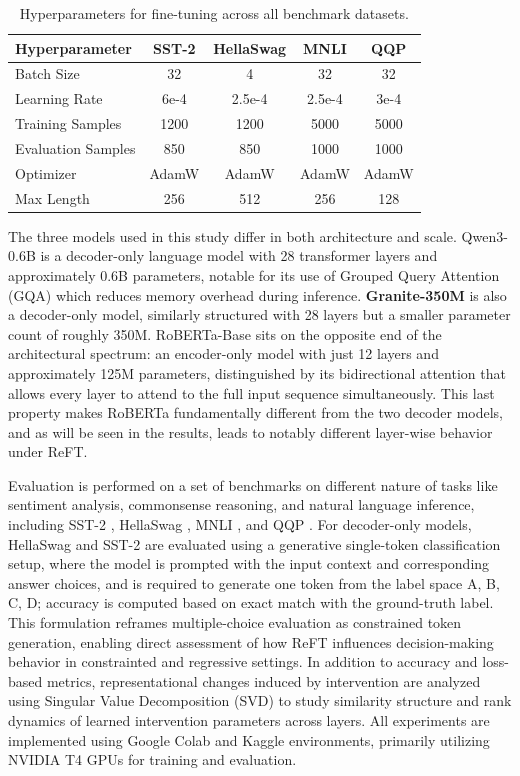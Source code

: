 \documentclass[conference]{IEEEtran}
\begin{document}
	\begin{table}[H]
	\centering
	\caption{Hyperparameters for fine-tuning across all benchmark datasets.}
	\label{tab:hyperparameters}
	\begin{tabular}{lcccc}
		\hline
		\textbf{Hyperparameter} & \textbf{SST-2} & \textbf{HellaSwag} & \textbf{MNLI} & \textbf{QQP} \\
		\hline
		Batch Size         & 32    & 4      & 32     & 32    \\
		Learning Rate      & 6e-4  & 2.5e-4 & 2.5e-4 & 3e-4  \\
		Training Samples   & 1200  & 1200   & 5000   & 5000  \\
		Evaluation Samples & 850   & 850    & 1000   & 1000  \\
		Optimizer          & AdamW & AdamW  & AdamW  & AdamW \\
		Max Length         & 256   & 512    & 256    & 128   \\
		\hline
	\end{tabular}
	\end{table}
	
	The three models used in this study differ in both architecture and scale. Qwen3-0.6B \cite{yang2025qwen3} is a decoder-only language model with 28 transformer layers and approximately 0.6B parameters, notable for its use of Grouped Query Attention (GQA) which reduces memory overhead during inference. \textbf{Granite-350M} is also a decoder-only model, similarly structured with 28 layers but a smaller parameter count of roughly 350M. RoBERTa-Base \cite{liu2019roberta} sits on the opposite end of the architectural spectrum: an encoder-only model with just 12 layers and approximately 125M parameters, distinguished by its bidirectional attention that allows every layer to attend to the full input sequence simultaneously. This last property makes RoBERTa fundamentally different from the two decoder models, and as will be seen in the results, leads to notably different layer-wise behavior under ReFT.

	Evaluation is performed on a set of benchmarks on different nature of tasks like sentiment analysis, commonsense reasoning, and natural language inference, including SST-2 \cite{socher2013recursive}, HellaSwag \cite{zellers2019hellaswag}, MNLI \cite{williams2017broad}, and QQP \cite{iyer2017quora}. For decoder-only models, HellaSwag and SST-2 are evaluated using a generative single-token classification setup, where the model is prompted with the input context and corresponding answer choices, and is required to generate one token from the label space {A, B, C, D}; accuracy is computed based on exact match with the ground-truth label. This formulation reframes multiple-choice evaluation as constrained token generation, enabling direct assessment of how ReFT influences decision-making behavior in constrainted and regressive settings. In addition to accuracy and loss-based metrics, representational changes induced by intervention are analyzed using Singular Value Decomposition (SVD) to study similarity structure and rank dynamics of learned intervention parameters across layers. All experiments are implemented using Google Colab and Kaggle environments, primarily utilizing NVIDIA T4 GPUs for training and evaluation.
	
\end{document}
